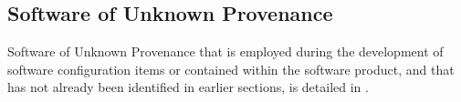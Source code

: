 \subsection{Software of Unknown Provenance}
Software of Unknown Provenance that is employed during the development of
software configuration items or contained within the software product, and that
has not already been identified in earlier sections, is detailed in
\soupdesignnum \textit{\soupdesigntitle}. 
